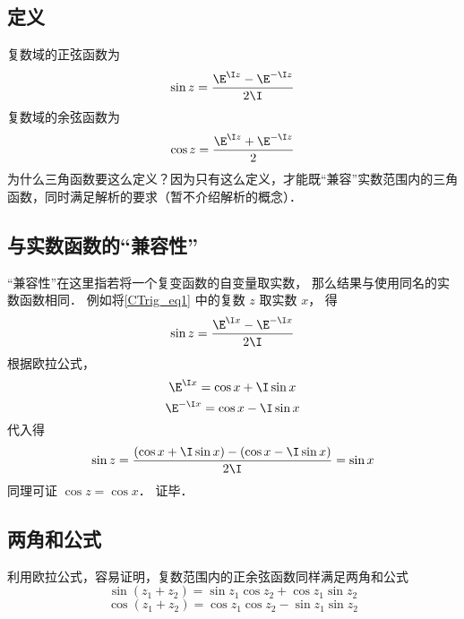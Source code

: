 
\subsection{定义}
复数域的正弦函数为
\begin{equation}\label{CTrig_eq1}
\sin z = \frac{\E^{\I z} - \E^{ - \I z}}{2\I}
\end{equation}
复数域的余弦函数为
\begin{equation}\label{CTrig_eq2}
\cos z = \frac{\E^{\I z} + \E^{ - \I z}}{2}
\end{equation}
为什么三角函数要这么定义？因为只有这么定义，才能既“兼容”实数范围内的三角函数，同时满足解析的要求（暂不介绍解析的概念）．

\subsection{与实数函数的“兼容性”}
“兼容性”在这里指若将一个复变函数的自变量取实数， 那么结果与使用同名的实数函数相同． 例如将\autoref{CTrig_eq1} 中的复数 $z$ 取实数 $x$， 得
\begin{equation}
\sin z = \frac{\E^{\I x} - \E^{ - \I x}}{2\I}
\end{equation} 
根据欧拉公式，
\begin{equation}
{\E^{\I x}} = \cos x + \I\sin x
\end{equation} 
\begin{equation}
{\E^{ - \I x}} = \cos x - \I \sin x
\end{equation} 
代入得
\begin{equation}
\sin z = \frac{(\cos x + \I\sin x) - (\cos x - \I\sin x)}{2\I} = \sin x
\end{equation}  
同理可证 $\cos z = \cos x$． 证毕．

\subsection{两角和公式}
利用欧拉公式，容易证明，复数范围内的正余弦函数同样满足两角和公式
\begin{equation}\label{CTrig_eq3}
\sin(z_1 + z_2) = \sin {z_1}\cos {z_2} + \cos {z_1}\sin {z_2}
\end{equation}
\begin{equation}\label{CTrig_eq4}
\cos (z_1 + z_2) = \cos {z_1}\cos {z_2} - \sin {z_1}\sin {z_2}
\end{equation}
